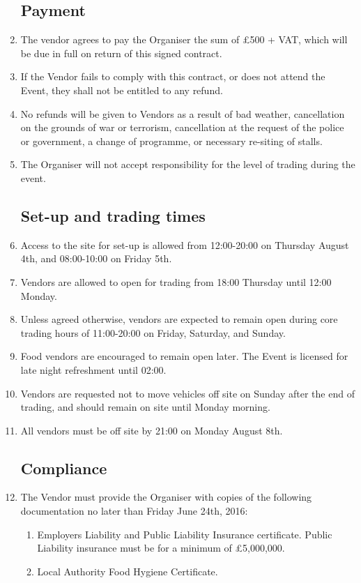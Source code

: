 \begin{enumerate}

\subsection*{Payment}
\item The vendor agrees to pay the Organiser the sum of £500 + VAT, which will be due in
      full on return of this signed contract.
\item If the Vendor fails to comply with this contract, or does not attend the Event,
        they shall not be entitled to any refund.
\item No refunds will be given to Vendors as a result of bad weather, cancellation on the
        grounds of war or terrorism, cancellation at the request of the police or government,
        a change of programme, or necessary re-siting of stalls.
\item The Organiser will not accept responsibility for the level of trading during the event.

\subsection*{Set-up and trading times}
\item Access to the site for set-up is allowed from 12:00-20:00 on Thursday August 4th, and
        08:00-10:00 on Friday 5th.
\item Vendors are allowed to open for trading from 18:00 Thursday until 12:00 Monday.
\item Unless agreed otherwise, vendors are expected to remain open during core trading
        hours of 11:00-20:00 on Friday, Saturday, and Sunday.
\item Food vendors are encouraged to remain open later. The Event is licensed for late
        night refreshment until 02:00.
\item Vendors are requested not to move vehicles off site on Sunday after the end of
        trading, and should remain on site until Monday morning.
\item All vendors must be off site by 21:00 on Monday August 8th.

\subsection*{Compliance}
\item The Vendor must provide the Organiser with copies of the following documentation no later
        than Friday June 24th, 2016:
\begin{enumerate}
    \item Employers Liability and Public Liability Insurance certificate.
            Public Liability insurance must be for a minimum of £5,000,000.
    \item Local Authority Food Hygiene Certificate.
\end{enumerate}


\end{enumerate}
